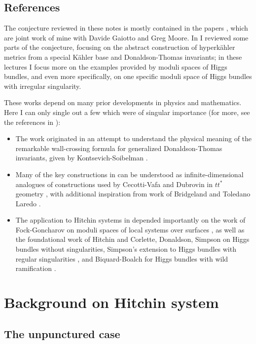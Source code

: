\documentclass[12pt,letterpaper,reqno]{article}
\newcounter{papers}\setcounter{papers}{0}
\numberwithin{equation}{section}
\newcommand{\kahler}{K\"ahler\xspace}
\newcommand{\hk}{hyperk\"ahler\xspace}
\begin{document}
\subsection{References}

The conjecture reviewed in these notes is mostly contained in 
the papers \cite{Gaiotto:2008cd,Gaiotto:2009hg},
which are joint work of mine with Davide Gaiotto and Greg
Moore.
In \cite{notes-hk} I reviewed some parts of the conjecture,
focusing on the abstract construction of \hk metrics from a
special \kahler base and Donaldson-Thomas invariants;
in these lectures I focus more on the examples provided by
moduli spaces of Higgs bundles,
and even more specifically, on one specific moduli space of
Higgs bundles with irregular singularity.

These works depend on many prior developments
in physics and mathematics. Here I can only single out a few
which were of singular importance (for more, see the references
in \cite{Gaiotto:2008cd,Gaiotto:2009hg}):
\begin{itemize}
\item The work \cite{Gaiotto:2008cd} 
originated in an attempt to understand the physical
meaning of the remarkable wall-crossing formula for generalized
Donaldson-Thomas invariants, given by Kontsevich-Soibelman \cite{ks1}.
\item Many of the key constructions in 
\cite{Gaiotto:2008cd} can
be understood as infinite-dimensional analogues 
of constructions used by Cecotti-Vafa and Dubrovin in 
$tt^*$ geometry \cite{Cecotti:1993rm,MR1213301}, with
additional inspiration from work of Bridgeland and 
Toledano Laredo \cite{stab-stokes}.
\item The application to Hitchin systems
in \cite{Gaiotto:2009hg} depended importantly on
the work of Fock-Goncharov on moduli spaces
of local systems over surfaces \cite{MR2233852},
as well as the foundational work
of Hitchin \cite{MR89a:32021} and Corlette, Donaldson, Simpson
\cite{MR965220,MR887285,MR944577} on Higgs bundles without
singularities, Simpson's extension to 
Higgs bundles with regular 
singularities \cite{hbnc}, and Biquard-Boalch for Higgs
bundles with wild ramification \cite{wnh}.
\end{itemize}

\section{Background on Hitchin system}

\subsection{The unpunctured case}
\end{document}
